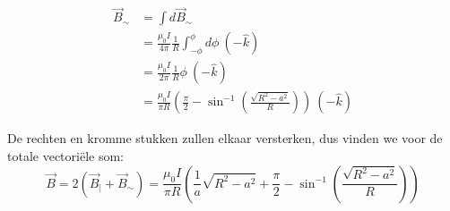 \begin{description}[labelwidth=1.5cm, leftmargin=!]
\begin{itemize}
            \begin{align*}
                \Vec{B}_{\sim} 
                    &= \int d\Vec{B}_{\sim} \\
                    &= \frac{\mu_0I}{4\pi}\frac{1}{R} \int_{-\phi}^{\phi} d\phi \ (-\hat{k}) \\
                    &= \frac{\mu_0I}{2\pi}\frac{1}{R} \phi \ (-\hat{k}) \\
                    &= \frac{\mu_0I}{\pi R}\left(\frac{\pi}{2}-\sin^{-1}\left(\frac{\sqrt{R^2-a^2}}{R}\right)\right) \ (-\hat{k}) 
            \end{align*}
    \end{itemize}
    De rechten en kromme stukken zullen elkaar versterken, dus vinden we voor de totale vectoriële som:
    \begin{equation*}
        \Vec{B} = 2(\vec{B}_{|} + \Vec{B}_{\sim}) = \frac{\mu_0I}{\pi R}\left(\frac{1}{a}\sqrt{R^2-a^2} + \frac{\pi}{2} -\sin^{-1}\left(\frac{\sqrt{R^2-a^2}}{R}\right) \right)
    \end{equation*}
    
\end{description}

\vspace{1cm}